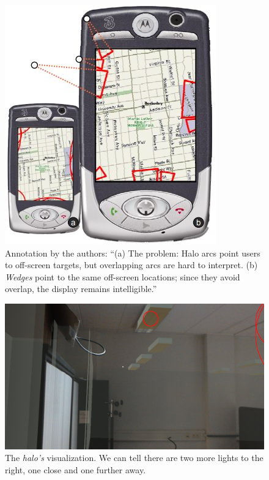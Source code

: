 \begin{figure}
    \centering
    \includegraphics[width=1.0\linewidth]{resources/implementation/baudisch.jpg}
    \caption{Annotation by the authors: ``(a) The problem: Halo arcs point users to off-screen targets, but overlapping arcs are hard to interpret. (b) \textit{Wedges} point to the same off-screen locations; since they avoid overlap, the display remains intelligible.'' \cite{baudisch1993halo}}
    \label{fig:baudisch}
\end{figure}

\begin{figure}
    \centering
    \includegraphics[width=1.0\linewidth]{resources/implementation/halos.jpg}
    \caption{The \textit{halo's} visualization. We can tell there are two more lights to the right, one close and one further away.}
    \label{fig:halos_vis}
\end{figure}

